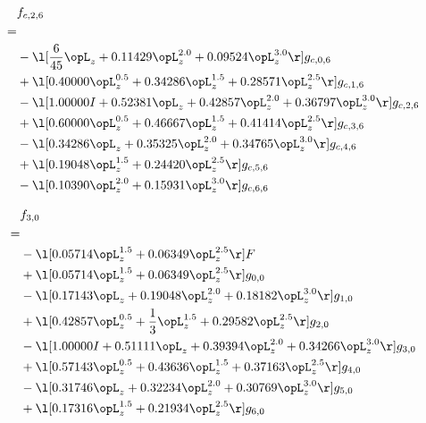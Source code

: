 \begin{alignat}{2} 
\label{eq:f_26_0} 
& f_{c,2,6} \nonumber \\ 
 = \\ 
& - \l[ \frac{6}{45} \opL_z +  0.11429 \opL_z^{2.0} +  0.09524 \opL_z^{3.0}  \r] g_{c,0,6} \nonumber \\ 
& + \l[  0.40000 \opL_z^{0.5} +  0.34286 \opL_z^{1.5} +  0.28571 \opL_z^{2.5}  \r] g_{c,1,6} \nonumber \\ 
& - \l[  1.00000 I +  0.52381 \opL_z +  0.42857 \opL_z^{2.0} +  0.36797 \opL_z^{3.0}  \r] g_{c,2,6} \nonumber \\ 
& + \l[  0.60000 \opL_z^{0.5} +  0.46667 \opL_z^{1.5} +  0.41414 \opL_z^{2.5}  \r] g_{c,3,6} \nonumber \\ 
& - \l[  0.34286 \opL_z +  0.35325 \opL_z^{2.0} +  0.34765 \opL_z^{3.0}  \r] g_{c,4,6} \nonumber \\ 
& + \l[  0.19048 \opL_z^{1.5} +  0.24420 \opL_z^{2.5}  \r] g_{c,5,6} \nonumber \\ 
& - \l[  0.10390 \opL_z^{2.0} +  0.15931 \opL_z^{3.0}  \r] g_{c,6,6} \nonumber \\ 
\end{alignat} 


\begin{alignat}{2} 
\label{eq:f_30_0} 
& f_{3,0} \nonumber \\ 
 = \\ 
& - \l[  0.05714 \opL_z^{1.5} +  0.06349 \opL_z^{2.5}  \r] F \nonumber \\ 
& + \l[  0.05714 \opL_z^{1.5} +  0.06349 \opL_z^{2.5}  \r] g_{0,0} \nonumber \\ 
& - \l[  0.17143 \opL_z +  0.19048 \opL_z^{2.0} +  0.18182 \opL_z^{3.0}  \r] g_{1,0} \nonumber \\ 
& + \l[  0.42857 \opL_z^{0.5} + \frac{1}{3} \opL_z^{1.5} +  0.29582 \opL_z^{2.5}  \r] g_{2,0} \nonumber \\ 
& - \l[  1.00000 I +  0.51111 \opL_z +  0.39394 \opL_z^{2.0} +  0.34266 \opL_z^{3.0}  \r] g_{3,0} \nonumber \\ 
& + \l[  0.57143 \opL_z^{0.5} +  0.43636 \opL_z^{1.5} +  0.37163 \opL_z^{2.5}  \r] g_{4,0} \nonumber \\ 
& - \l[  0.31746 \opL_z +  0.32234 \opL_z^{2.0} +  0.30769 \opL_z^{3.0}  \r] g_{5,0} \nonumber \\ 
& + \l[  0.17316 \opL_z^{1.5} +  0.21934 \opL_z^{2.5}  \r] g_{6,0} \nonumber \\ 
\end{alignat} 


